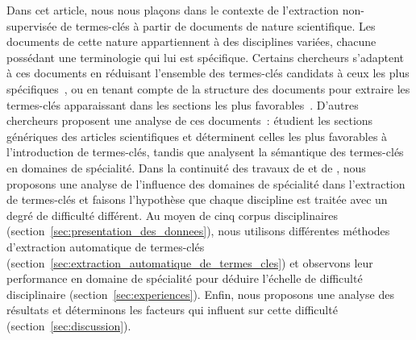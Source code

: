  Dans cet article, nous nous plaçons dans le contexte de l'extraction
  non-supervisée de termes-clés à partir de documents de nature scientifique.
  Les documents de cette nature appartiennent à des disciplines variées, chacune
  possédant une terminologie qui lui est spécifique. Certains chercheurs
  s'adaptent à ces documents en réduisant l'ensemble des termes-clés candidats à
  ceux les plus spécifiques~\cite{kim2009termextraction}, ou en tenant compte de
  la structure des documents pour extraire les termes-clés apparaissant dans les
  sections les plus favorables~\cite{hofmann2009impactofdocumentstructure}.
  D'autres chercheurs proposent une analyse de ces documents~:
   étudient les sections génériques des
  articles scientifiques et déterminent celles les plus favorables à
  l'introduction de termes-clés, tandis que
   analysent la sémantique des
  termes-clés en domaines de spécialité. Dans la continuité des travaux de
   et de
  ,
  nous proposons une analyse de l'influence des domaines de spécialité dans
  l'extraction de termes-clés et faisons l'hypothèse que chaque discipline est
  traitée avec un degré de difficulté différent. Au moyen de cinq corpus
  disciplinaires (section~\ref{sec:presentation_des_donnees}), nous utilisons
  différentes méthodes d'extraction automatique de termes-clés
  (section~\ref{sec:extraction_automatique_de_termes_cles}) et observons leur
  performance en domaine de spécialité pour déduire l'échelle de difficulté
  disciplinaire (section~\ref{sec:experiences}). Enfin, nous proposons une
  analyse des résultats et déterminons les facteurs qui influent sur cette
  difficulté (section~\ref{sec:discussion}).

%

